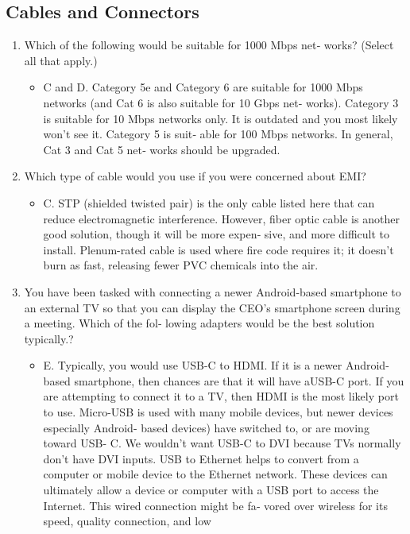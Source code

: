 \documentclass{article}
\begin{document}
\subsection{Cables and Connectors}
\begin{enumerate}
    \item Which of the following would be suitable for 1000 Mbps net‐
works? (Select all that apply.)
    \begin{itemize}
        \item C and D. Category 5e and Category 6 are suitable for 1000
Mbps networks (and Cat 6 is also suitable for 10 Gbps net‐
works). Category 3 is suitable for 10 Mbps networks only. It is
outdated and you most likely won’t see it. Category 5 is suit‐
able for 100 Mbps networks. In general, Cat 3 and Cat 5 net‐
works should be upgraded.
    \end{itemize}
    \item Which type of cable would you use if you were concerned
about EMI?
    \begin{itemize}
        \item C. STP (shielded twisted pair) is the only cable listed here that
can reduce electromagnetic interference. However, fiber optic
cable is another good solution, though it will be more expen‐
sive, and more difficult to install. Plenum-rated cable is used
where fire code requires it; it doesn’t burn as fast, releasing
fewer PVC chemicals into the air.
    \end{itemize}
    \item You have been tasked with connecting a newer Android-based
smartphone to an external TV so that you can display the
CEO’s smartphone screen during a meeting. Which of the fol‐
lowing adapters would be the best solution typically.?
    \begin{itemize}
        \item E. Typically, you would use USB-C to HDMI. If it is a newer
Android-based smartphone, then chances are that it will have aUSB-C port. If you are attempting to connect it to a TV, then
HDMI is the most likely port to use. Micro-USB is used with
many mobile devices, but newer devices especially Android-
based devices) have switched to, or are moving toward USB-
C. We wouldn’t want USB-C to DVI because TVs normally
don’t have DVI inputs. USB to Ethernet helps to convert from
a computer or mobile device to the Ethernet network. These
devices can ultimately allow a device or computer with a USB
port to access the Internet. This wired connection might be fa‐
vored over wireless for its speed, quality connection, and low

\end{itemize}
\end{enumerate}
\end{document}
